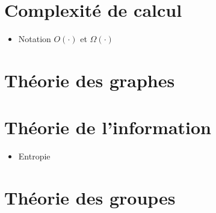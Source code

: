 \begin{comment}
\end{comment}

\appendix

\chapter{Complexité de calcul}
\label{chap:complexite_calcul}

\begin{itemize}
  \item Notation $O(\cdot)$ et $\Omega(\cdot)$
\end{itemize}

\chapter{Théorie des graphes}
\label{chap:theo_graphe}

\chapter{Théorie de l'information}
\label{chap:theo_info}

\begin{itemize}
  \item Entropie
\end{itemize}

\chapter{Théorie des groupes}
\label{chap:theo_groupes}


